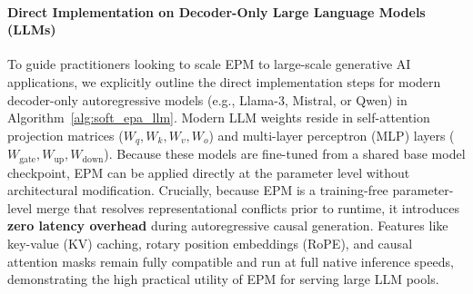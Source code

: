 \paragraph{Direct Implementation on Decoder-Only Large Language Models (LLMs)}
To guide practitioners looking to scale EPM to large-scale generative AI applications, we explicitly outline the direct implementation steps for modern decoder-only autoregressive models (e.g., Llama-3, Mistral, or Qwen) in Algorithm~\ref{alg:soft_epa_llm}. Modern LLM weights reside in self-attention projection matrices ($W_q, W_k, W_v, W_o$) and multi-layer perceptron (MLP) layers ($W_{\text{gate}}, W_{\text{up}}, W_{\text{down}}$). Because these models are fine-tuned from a shared base model checkpoint, EPM can be applied directly at the parameter level without architectural modification. Crucially, because EPM is a training-free parameter-level merge that resolves representational conflicts prior to runtime, it introduces \textbf{zero latency overhead} during autoregressive causal generation. Features like key-value (KV) caching, rotary position embeddings (RoPE), and causal attention masks remain fully compatible and run at full native inference speeds, demonstrating the high practical utility of EPM for serving large LLM pools.

